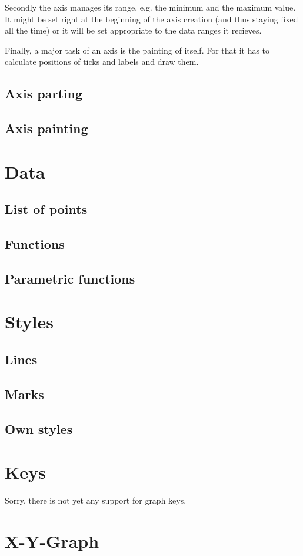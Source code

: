 Secondly the axis manages its range, e.g. the minimum and the maximum
value. It might be set right at the beginning of the axis creation
(and thus staying fixed all the time) or it will be set appropriate to
the data ranges it recieves.

Finally, a major task of an axis is the painting of itself. For that
it has to calculate positions of ticks and labels and draw them.

\subsection{Axis parting}

\subsection{Axis painting}

\section{Data}

\subsection{List of points}

\subsection{Functions}

\subsection{Parametric functions}

\section{Styles}

\subsection{Lines}

\subsection{Marks}

\subsection{Own styles}

\section{Keys}
Sorry, there is not yet any support for graph keys.

\section{X-Y-Graph}

